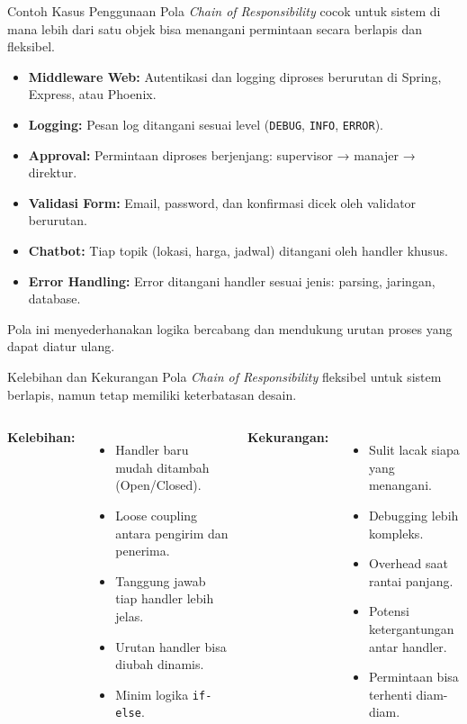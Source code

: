 \documentclass[aspectratio=169, table]{beamer}
\begin{document}
\begin{frame}{Contoh Kasus Penggunaan}
	\vspace{10pt}
	Pola \textit{Chain of Responsibility} cocok untuk sistem di mana lebih dari satu objek bisa menangani permintaan secara berlapis dan fleksibel.
	
	\vspace{6pt}
	\begin{itemize}
		\item \textbf{Middleware Web:} Autentikasi dan logging diproses berurutan di Spring, Express, atau Phoenix.
		\item \textbf{Logging:} Pesan log ditangani sesuai level (\texttt{DEBUG}, \texttt{INFO}, \texttt{ERROR}).
		\item \textbf{Approval:} Permintaan diproses berjenjang: supervisor → manajer → direktur.
		\item \textbf{Validasi Form:} Email, password, dan konfirmasi dicek oleh validator berurutan.
		\item \textbf{Chatbot:} Tiap topik (lokasi, harga, jadwal) ditangani oleh handler khusus.
		\item \textbf{Error Handling:} Error ditangani handler sesuai jenis: parsing, jaringan, database.
	\end{itemize}
	
	\vspace{4pt}
	Pola ini menyederhanakan logika bercabang dan mendukung urutan proses yang dapat diatur ulang.
\end{frame}


\begin{frame}{Kelebihan dan Kekurangan}
	\vspace{10pt}
	Pola \textit{Chain of Responsibility} fleksibel untuk sistem berlapis, namun tetap memiliki keterbatasan desain.
	
	\vspace{4pt}
	\begin{columns}[T]
		\textbf{Kelebihan:}
		\begin{itemize}
			\item Handler baru mudah ditambah (Open/Closed).
			\item Loose coupling antara pengirim dan penerima.
			\item Tanggung jawab tiap handler lebih jelas.
			\item Urutan handler bisa diubah dinamis.
			\item Minim logika \texttt{if-else}.
		\end{itemize}
		
		\textbf{Kekurangan:}
		\begin{itemize}
			\item Sulit lacak siapa yang menangani.
			\item Debugging lebih kompleks.
			\item Overhead saat rantai panjang.
			\item Potensi ketergantungan antar handler.
			\item Permintaan bisa terhenti diam-diam.
		\end{itemize}
	\end{columns}
\end{frame}
\end{document}
